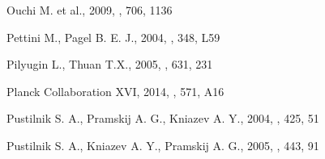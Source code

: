 \begin{thebibliography}{}

 Ouchi M. et al., 2009, \apj, 706, 1136


 Pettini M., Pagel B. E. J., 2004,
\mnras, 348, L59


 Pilyugin L., Thuan T.X., 2005,
\apj, 631, 231

 Planck Collaboration XVI,
2014, \aap, 571, A16





Pustilnik S. A., Pramskij A. G., Kniazev A. Y., 2004, \aap, 425, 51 %

Pustilnik S. A., Kniazev A. Y., Pramskij A. G., 2005, \aap, 443, 91









\end{thebibliography}
